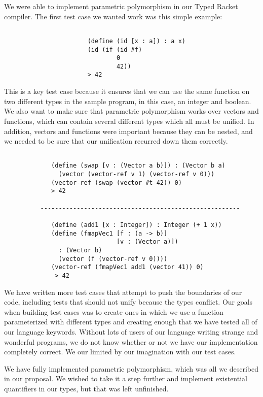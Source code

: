 \documentclass{article}
\begin{document}
We were able to implement parametric polymorphism in our Typed Racket compiler.
The first test case we wanted work was this simple example:
\begin{verbatim}

                       (define (id [x : a]) : a x)
                       (id (if (id #f)
                               0
                               42))
                       > 42
\end{verbatim}
This is a key test case because it ensures that we can use the same function on
two different types in the sample program, in this case, an integer and boolean.
We also want to make sure that parametric polymorphism works over vectors and
functions, which can contain several different types which all must be unified.
In addition, vectors and functions were important because they can be nested,
and we needed to be sure that our unification recurred down them correctly.
\begin{verbatim}

             (define (swap [v : (Vector a b)]) : (Vector b a)
               (vector (vector-ref v 1) (vector-ref v 0)))
             (vector-ref (swap (vector #t 42)) 0)
             > 42

          -------------------------------------------------------

             (define (add1 [x : Integer]) : Integer (+ 1 x))
             (define (fmapVec1 [f : (a -> b)]
                               [v : (Vector a)])
               : (Vector b)
               (vector (f (vector-ref v 0))))
             (vector-ref (fmapVec1 add1 (vector 41)) 0)
              > 42
\end{verbatim}

We have written more test cases that attempt to push the boundaries of our code,
including tests that should not unify because the types conflict. Our goals
when building test cases was to create ones in which we use a function
parameterized with different types and creating enough that we have tested all
of our language keywords. Without lots of users of our language writing strange
and wonderful programs, we do not know whether or not we have our implementation
completely correct. We our limited by our imagination with our test cases.

We have fully implemented parametric polymorphism, which was all we described in
our proposal. We wished to take it a step further and implement existential
quantifiers in our types, but that was left unfinished.
\end{document}
